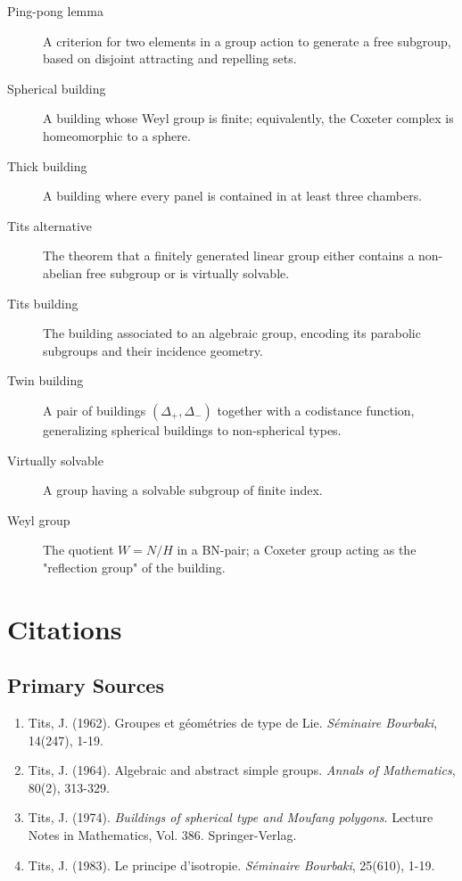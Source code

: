 \begin{description}
    \item[Ping-pong lemma] A criterion for two elements in a group action to generate a free subgroup, based on disjoint attracting and repelling sets.
    \item[Spherical building] A building whose Weyl group is finite; equivalently, the Coxeter complex is homeomorphic to a sphere.
    \item[Thick building] A building where every panel is contained in at least three chambers.
    \item[Tits alternative] The theorem that a finitely generated linear group either contains a non-abelian free subgroup or is virtually solvable.
    \item[Tits building] The building associated to an algebraic group, encoding its parabolic subgroups and their incidence geometry.
    \item[Twin building] A pair of buildings \((\Delta_+, \Delta_-)\) together with a codistance function, generalizing spherical buildings to non-spherical types.
    \item[Virtually solvable] A group having a solvable subgroup of finite index.
    \item[Weyl group] The quotient \(W = N/H\) in a BN-pair; a Coxeter group acting as the "reflection group" of the building.
\end{description}

\section{Citations}

\subsection*{Primary Sources}
\begin{enumerate}
    \item Tits, J. (1962). Groupes et géométries de type de Lie. \textit{Séminaire Bourbaki}, 14(247), 1-19.
    \item Tits, J. (1964). Algebraic and abstract simple groups. \textit{Annals of Mathematics}, 80(2), 313-329.
    \item Tits, J. (1974). \textit{Buildings of spherical type and Moufang polygons}. Lecture Notes in Mathematics, Vol. 386. Springer-Verlag.
    \item Tits, J. (1983). Le principe d'isotropie. \textit{Séminaire Bourbaki}, 25(610), 1-19.
\end{enumerate}

